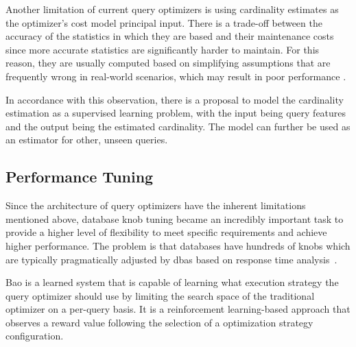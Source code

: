 Another limitation of current query optimizers is using cardinality estimates as the optimizer's cost model principal input. There is a trade-off between the accuracy of the statistics in which they are based and their maintenance costs since more accurate statistics are significantly harder to maintain. For this reason, they are usually computed based on simplifying assumptions that are frequently wrong in real-world scenarios, which may result in poor performance \citep{Leis2015}.

In accordance with this observation, there is a proposal \citep{Kipf2018} to model the cardinality estimation as a supervised learning problem, with the input being query features and the output being the estimated cardinality. The model can further be used as an estimator for other, unseen queries.

\subsection{Performance Tuning}

Since the architecture of query optimizers have the inherent limitations mentioned above, database knob tuning became an incredibly important task to provide a higher level of flexibility to meet specific requirements and achieve higher performance. The problem is that databases have hundreds of knobs which are typically pragmatically adjusted by \gls{dbas} based on response time analysis~\citep{ferreira2020self,vanaken17}.

Bao \citep{Marcus2020} is a learned system that is capable of learning what execution strategy the query optimizer should use by limiting the search space of the traditional optimizer on a per-query basis. It is a reinforcement learning-based approach that observes a reward value following the selection of a optimization strategy configuration.